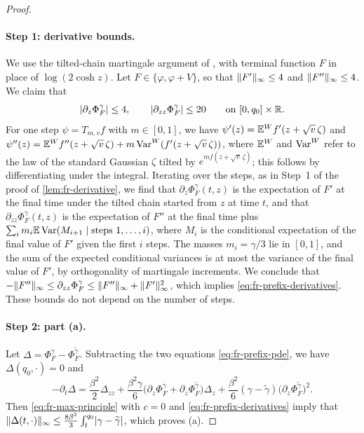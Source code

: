 \begin{proof}
\paragraph{Step 1: derivative bounds.} We use the tilted-chain martingale argument of \cite[proof of Lemma~3.1]{oai-barriers}, with terminal function $F$ in place of $\log(2\cosh z)$. Let $F\in\{\varphi,\varphi+V\}$, so that $\lVert F'\rVert_\infty\le4$ and $\lVert F''\rVert_\infty\le4$. We claim that
\begin{equation}\label{eq:fr-prefix-derivatives}
 \lvert \partial_z\Phi^\gamma_F\rvert\le4,\qquad\lvert \partial_{zz}\Phi^\gamma_F\rvert\le20\qquad\text{on }[0,q_0]\times\mathbb R.
\end{equation}
For one step $\psi=T_{m,v}f$ with $m\in[0,1]$, we have $\psi'(z)=\mathbb E^Wf'(z+\sqrt v\,\zeta)$ and $\psi''(z)=\mathbb E^Wf''(z+\sqrt v\,\zeta)+m\operatorname{Var}^W(f'(z+\sqrt v\,\zeta))$, where $\mathbb E^W$ and $\operatorname{Var}^W$ refer to the law of the standard Gaussian $\zeta$ tilted by $e^{mf(z+\sqrt v\,\zeta)}$; this follows by differentiating under the integral. Iterating over the steps, as in Step~1 of the proof of \cref{lem:fr-derivative}, we find that $\partial_z\Phi^\gamma_F(t,z)$ is the expectation of $F'$ at the final time under the tilted chain started from $z$ at time $t$, and that $\partial_{zz}\Phi^\gamma_F(t,z)$ is the expectation of $F''$ at the final time plus $\sum_im_i\mathbb E\operatorname{Var}(M_{i+1}\mid\text{steps }1,\dots,i)$, where $M_i$ is the conditional expectation of the final value of $F'$ given the first $i$ steps. The masses $m_i=\gamma/3$ lie in $[0,1]$, and the sum of the expected conditional variances is at most the variance of the final value of $F'$, by orthogonality of martingale increments. We conclude that $-\lVert F''\rVert_\infty\le\partial_{zz}\Phi^\gamma_F\le\lVert F''\rVert_\infty+\lVert F'\rVert_\infty^2$, which implies \eqref{eq:fr-prefix-derivatives}. These bounds do not depend on the number of steps.

\paragraph{Step 2: part (a).} Let $\Delta=\Phi^\gamma_F-\Phi^{\widetilde\gamma}_F$. Subtracting the two equations \eqref{eq:fr-prefix-pde}, we have $\Delta(q_0,\cdot)=0$ and
\[
 -\partial_t\Delta=\frac{\beta^2}2\Delta_{zz}+\frac{\beta^2\gamma}6\bigl(\partial_z\Phi^\gamma_F+\partial_z\Phi^{\widetilde\gamma}_F\bigr)\Delta_z+\frac{\beta^2}6(\gamma-\widetilde\gamma)\bigl(\partial_z\Phi^{\widetilde\gamma}_F\bigr)^2.
\]
Then \eqref{eq:fr-max-principle} with $c=0$ and \eqref{eq:fr-prefix-derivatives} imply that $\lVert \Delta(t,\cdot)\rVert_\infty\le\frac{8\beta^2}3\int_t^{q_0}\lvert \gamma-\widetilde\gamma\rvert$, which proves (a).


\end{proof}
